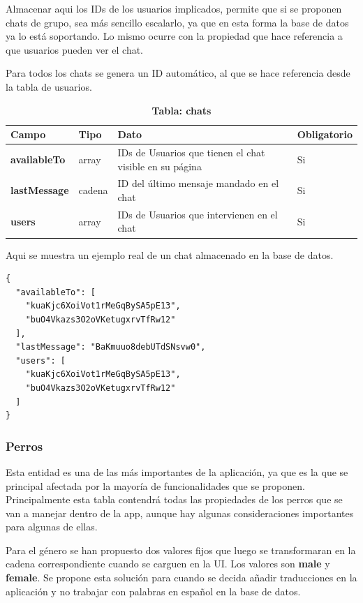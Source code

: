 \documentclass[a4paper, 12pt]{article}
\begin{document}
Almacenar aqui los IDs de los usuarios implicados, permite que si se proponen chats de grupo, sea más sencillo escalarlo, ya que en esta forma la base de datos ya lo está soportando. Lo mismo ocurre con la propiedad que hace referencia a que usuarios pueden ver el chat. 

Para todos los chats se genera un ID automático, al que se hace referencia desde la tabla de usuarios.

\begin{table}[H]
\captionsetup{justification=raggedright,singlelinecheck=false}
\caption{\textbf{Tabla: chats}}
\label{tab:chats}
	\begin{tabular}{|m{3cm}|m{2cm}|m{5cm}|m{3cm}|}
	\hline
	\textbf{Campo} & \textbf{Tipo} & \textbf{Dato} & \textbf{Obligatorio} \\ 
	\hline
	\textbf{availableTo} & array & IDs de Usuarios que tienen el chat visible en su página & Si \\ 
	\hline
	\textbf{lastMessage} & cadena & ID del último mensaje mandado en el chat & Si\\ 
	\hline
	\textbf{users} &  array & IDs de Usuarios que intervienen en el chat & Si \\ 
	\hline
\end{tabular}
\end{table}

Aqui se muestra un ejemplo real de un chat almacenado en la base de datos. 

\begin{verbatim}
{
  "availableTo": [
    "kuaKjc6XoiVot1rMeGqBySA5pE13",
    "buO4Vkazs3O2oVKetugxrvTfRw12"
  ],
  "lastMessage": "BaKmuuo8debUTdSNsvw0",
  "users": [
    "kuaKjc6XoiVot1rMeGqBySA5pE13",
    "buO4Vkazs3O2oVKetugxrvTfRw12"
  ]
}
\end{verbatim}

\subsubsection{Perros}

Esta entidad es una de las más importantes de la aplicación, ya que es la que se principal afectada por la mayoría de funcionalidades que se proponen. Principalmente esta tabla contendrá todas las propiedades de los perros que se van a manejar dentro de la app, aunque hay algunas consideraciones importantes para algunas de ellas.

Para el género se han propuesto dos valores fijos que luego se transformaran en la cadena correspondiente cuando se carguen en la UI. Los valores son \textbf{male} y \textbf{female}. Se propone esta solución para cuando se decida añadir traducciones en la aplicación y no trabajar con palabras en español en la base de datos.
\end{document}
